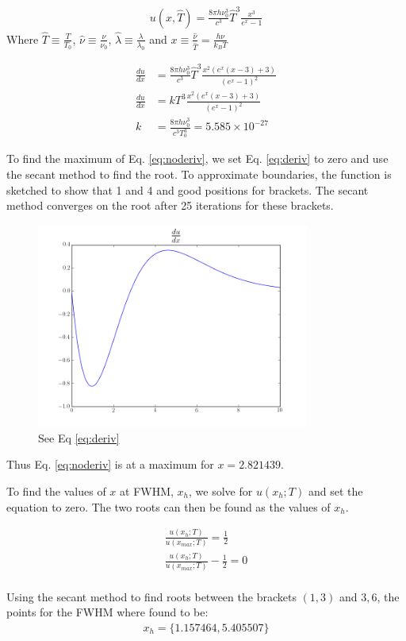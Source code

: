 \documentclass[12pt]{article}
\begin{document}
  \clearpage

  \begin{align}
    \label{eq:noderiv}
    u(x,\hat{T}) = \frac{8\pi h \nu_0^3}{c^3}\hat{T}^3\frac{x^3}{e^x-1}
  \end{align}
  Where $\hat{T} \equiv \frac{T}{T_0}$, $\hat{\nu} \equiv \frac{\nu}{\nu_0}$,
  $\hat{\lambda} \equiv \frac{\lambda}{\lambda_0}$ and $x \equiv \frac{\hat{\nu}}{\hat{T}} = \frac{h\nu}{k_BT}$


  \begin{align}
    \frac{du}{dx} &= \frac{8\pi h \nu_0^3}{c^3}\hat{T}^3\frac{x^2(e^x(x-3)+3)}{(e^x-1)^2} \\
    \label{eq:deriv}
    \frac{du}{dx} &= k T^3\frac{x^2(e^x(x-3)+3)}{(e^x-1)^2} \\
    k &= \frac{8\pi h \nu_0^3}{c^3T_0^3} = 5.585 \times 10^{-27} \nonumber
  \end{align}

  To find the maximum of Eq. \ref{eq:noderiv}, we set Eq. \ref{eq:deriv} to zero
  and use the secant method to find the root. To approximate boundaries, the
  function is sketched to show that 1 and 4 and good positions for brackets.
  The secant method converges on the root after 25 iterations for these brackets.

  

  \begin{figure}[h]
    \centering
    \includegraphics[width=0.8\textwidth]{Problem9c.png}
    \caption{See Eq \ref{eq:deriv}}
  \end{figure}

  Thus Eq. \ref{eq:noderiv} is at a maximum for $x=2.821439$.

  To find the values of $x$ at FWHM, $x_h$, we solve for $u(x_h;T)$ and set the
  equation to zero. The two roots can then be found as the values of $x_h$.

  \begin{align}
    \frac{u(x_h;T)}{u(x_{max};T)} = \frac{1}{2} \nonumber \\
    \frac{u(x_h;T)}{u(x_{max};T)} - \frac{1}{2}=0 \\
  \end{align}

  Using the secant method to find roots between the brackets $(1,3)$ and $3,6$,
  the points for the FWHM where found to be:
  \begin{align}
    x_h = \{1.157464, 5.405507\} \nonumber
  \end{align}

  
\end{document}
